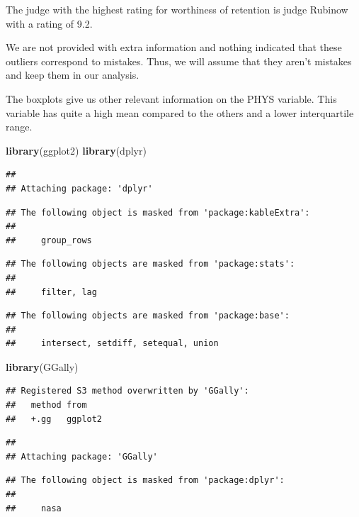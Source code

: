 \documentclass[]{article}
\newenvironment{Shaded}{\begin{snugshade}}{\end{snugshade}}
\newcommand{\KeywordTok}[1]{\textcolor[rgb]{0.13,0.29,0.53}{\textbf{#1}}}
\newcommand{\NormalTok}[1]{#1}
\begin{document}
The judge with the highest rating for worthiness of retention is judge
Rubinow with a rating of 9.2.

We are not provided with extra information and nothing indicated that
these outliers correspond to mistakes. Thus, we will assume that they
aren't mistakes and keep them in our analysis.

The boxplots give us other relevant information on the PHYS variable.
This variable has quite a high mean compared to the others and a lower
interquartile range.

\begin{Shaded}
\begin{Highlighting}[]
\KeywordTok{library}\NormalTok{(ggplot2)}
\KeywordTok{library}\NormalTok{(dplyr)}
\end{Highlighting}
\end{Shaded}

\begin{verbatim}
## 
## Attaching package: 'dplyr'
\end{verbatim}

\begin{verbatim}
## The following object is masked from 'package:kableExtra':
## 
##     group_rows
\end{verbatim}

\begin{verbatim}
## The following objects are masked from 'package:stats':
## 
##     filter, lag
\end{verbatim}

\begin{verbatim}
## The following objects are masked from 'package:base':
## 
##     intersect, setdiff, setequal, union
\end{verbatim}

\begin{Shaded}
\begin{Highlighting}[]
\KeywordTok{library}\NormalTok{(GGally)}
\end{Highlighting}
\end{Shaded}

\begin{verbatim}
## Registered S3 method overwritten by 'GGally':
##   method from   
##   +.gg   ggplot2
\end{verbatim}

\begin{verbatim}
## 
## Attaching package: 'GGally'
\end{verbatim}

\begin{verbatim}
## The following object is masked from 'package:dplyr':
## 
##     nasa
\end{verbatim}
\end{document}
